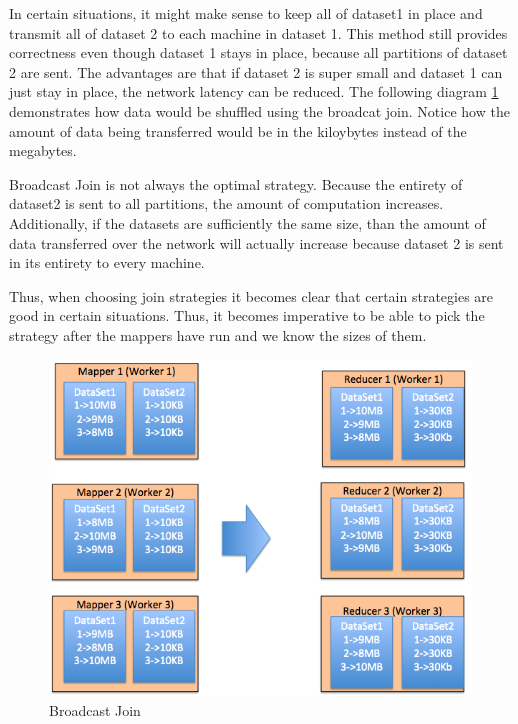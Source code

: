 In certain situations, it might make sense to keep all of dataset1 in place and transmit all of dataset 2 to each
machine in dataset 1. This method still provides correctness even though dataset 1 stays in place, because all partitions
of dataset 2 are sent. The advantages are that if dataset 2 is super small and dataset 1 can just stay in place, 
the network latency can be reduced. The following diagram \ref{fig:broadcast_join} demonstrates how data would be shuffled
using the broadcat join. Notice how the amount of data being transferred would be in the kiloybytes instead of the megabytes.

Broadcast Join is not always the optimal strategy. Because the entirety of dataset2 is sent to all partitions, the amount of computation
increases. Additionally, if the datasets are sufficiently the same size, than the amount of data transferred over the network will actually
increase because dataset 2 is sent in its entirety to every machine. 

Thus, when choosing join strategies it becomes clear that certain strategies are good in certain situations. Thus, it becomes imperative
to be able to pick the strategy after the mappers have run and we know the sizes of them.

 \begin{figure}[h]
\begin{center}
\includegraphics[scale=1.0]{./img/broadcast_join.png}
\caption{Broadcast Join}
\label{fig:broadcast_join}
\end{center}
\end{figure}


